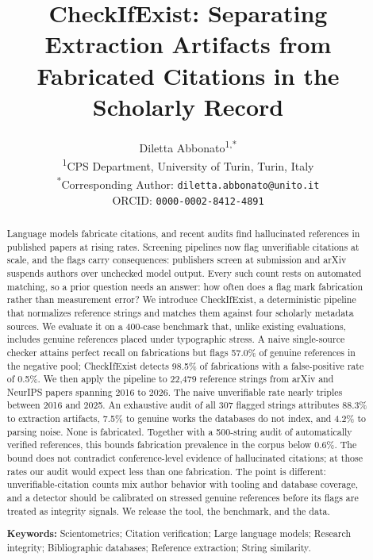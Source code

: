 \documentclass[11pt, a4paper]{article}
\title{\textbf{CheckIfExist: Separating Extraction Artifacts from Fabricated Citations in the Scholarly Record}}
\author{
    Diletta Abbonato\textsuperscript{1,*} \\
    \small \textsuperscript{1}CPS Department, University of Turin, Turin, Italy \\
    \small \textsuperscript{*}Corresponding Author: \texttt{diletta.abbonato@unito.it} \\
    \small ORCID: \texttt{0000-0002-8412-4891}
}
\date{}
\begin{document}
\maketitle

\begin{abstract}
Language models fabricate citations, and recent audits find hallucinated references in published papers at rising rates. Screening pipelines now flag unverifiable citations at scale, and the flags carry consequences: publishers screen at submission and arXiv suspends authors over unchecked model output. Every such count rests on automated matching, so a prior question needs an answer: how often does a flag mark fabrication rather than measurement error? We introduce CheckIfExist, a deterministic pipeline that normalizes reference strings and matches them against four scholarly metadata sources. We evaluate it on a 400-case benchmark that, unlike existing evaluations, includes genuine references placed under typographic stress. A naive single-source checker attains perfect recall on fabrications but flags 57.0\% of genuine references in the negative pool; CheckIfExist detects 98.5\% of fabrications with a false-positive rate of 0.5\%. We then apply the pipeline to 22{,}479 reference strings from arXiv and NeurIPS papers spanning 2016 to 2026. The naive unverifiable rate nearly triples between 2016 and 2025. An exhaustive audit of all 307 flagged strings attributes 88.3\% to extraction artifacts, 7.5\% to genuine works the databases do not index, and 4.2\% to parsing noise. None is fabricated. Together with a 500-string audit of automatically verified references, this bounds fabrication prevalence in the corpus below 0.6\%. The bound does not contradict conference-level evidence of hallucinated citations; at those rates our audit would expect less than one fabrication. The point is different: unverifiable-citation counts mix author behavior with tooling and database coverage, and a detector should be calibrated on stressed genuine references before its flags are treated as integrity signals. We release the tool, the benchmark, and the data.

\vspace{6pt}
\noindent \textbf{Keywords:} Scientometrics; Citation verification; Large language models; Research integrity; Bibliographic databases; Reference extraction; String similarity.
\end{abstract}
\end{document}
